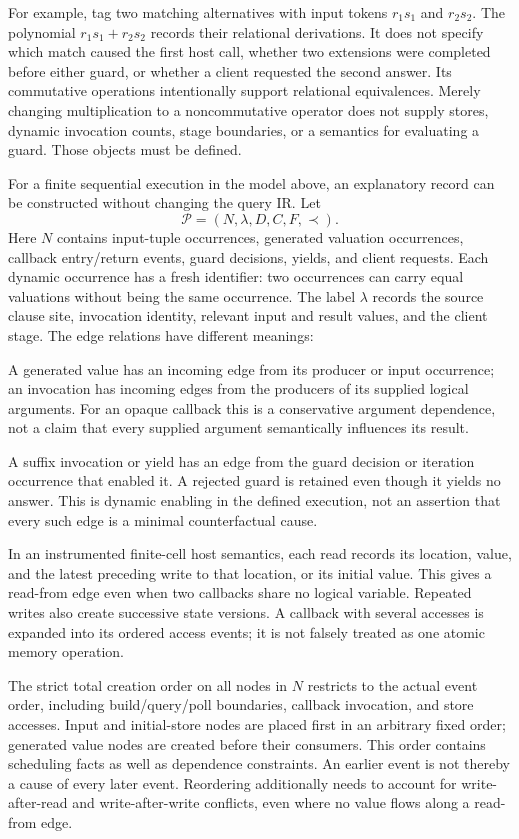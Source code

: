 For example, tag two matching alternatives with input tokens $r_1s_1$ and
$r_2s_2$. The polynomial $r_1s_1+r_2s_2$ records their relational derivations.
It does not specify which match caused the first host call, whether two
extensions were completed before either guard, or whether a client requested
the second answer. Its commutative operations intentionally support
relational equivalences. Merely changing multiplication to a noncommutative
operator does not supply stores, dynamic invocation counts, stage boundaries,
or a semantics for evaluating a guard. Those objects must be defined.

For a finite sequential execution in the model above, an explanatory record
can be constructed without changing the query IR. Let
\[
 \mathcal P=(N,\lambda,D,C,F,\prec).
\]
Here $N$ contains input-tuple occurrences, generated valuation occurrences,
callback entry/return events, guard decisions, yields, and client requests. Each
dynamic occurrence has a fresh identifier: two occurrences can carry equal
valuations without being the same occurrence. The label $\lambda$ records
the source clause site, invocation identity, relevant input and result
values, and the client stage. The edge relations have different meanings:
\begin{description}[style=nextline,leftmargin=1.5em]
\item[$D$: data dependence.]
A generated value has an incoming edge from its producer or input occurrence;
an invocation has incoming edges from the producers of its supplied logical
arguments. For an opaque callback this is a conservative argument dependence,
not a claim that every supplied argument semantically influences its result.
\item[$C$: control dependence.]
A suffix invocation or yield has an edge from the guard decision or iteration
occurrence that enabled it. A rejected guard is retained even though it yields
no answer. This is dynamic enabling in the defined execution, not an assertion
that every such edge is a minimal counterfactual cause.
\item[$F$: state dependence.]
In an instrumented finite-cell host semantics, each read records its location,
value, and the latest preceding write to that location, or its initial value.
This gives a read-from edge even when two callbacks share no logical variable.
Repeated writes also create successive state versions. A callback with several
accesses is expanded into its ordered access events; it is not falsely treated
as one atomic memory operation.
\item[$\prec$: recorded execution order.]
The strict total creation order on all nodes in $N$ restricts to the actual
event order, including build/query/poll boundaries, callback invocation, and
store accesses. Input and initial-store nodes are placed first in an
arbitrary fixed order; generated value nodes are created before their
consumers. This order contains scheduling facts as
well as dependence constraints. An earlier event is not thereby a cause of
every later event. Reordering additionally needs to account for write-after-read
and write-after-write conflicts, even where no value flows along a read-from
edge.
\end{description}
